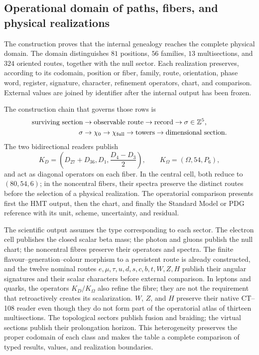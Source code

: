 \subsection*{Operational domain of paths, fibers, and physical realizations}

The construction proves that the internal genealogy reaches the complete
physical domain. The domain distinguishes
\(81\) positions, \(56\) families, \(13\) multisections, and \(324\) oriented
routes, together with the null sector. Each realization preserves, according to its codomain,
position or fiber, family, route, orientation, phase word, register,
signature, character, refinement operators, chart, and comparison. External
values are joined by identifier after the internal output has been frozen.

The construction chain that governs those rows is
\[
 \begin{aligned}
 \text{surviving section}&\to\text{observable route}
 \to\text{record}\to\sigma\in\mathbb Z^5,\\
 \sigma&\to\chi_0\to\chi_{\rm full}\to\text{towers}
 \to\text{dimensional section}.
 \end{aligned}
\]
The two bidirectional readers publish
\[
 K_D=\left(D_{27}+D_{36},D_1,\frac{D_4-D_3}{2}\right),
 \qquad
 K_\Omega=(\Omega,54,P_6),
\]
and act as diagonal operators on each fiber. In the central cell, both reduce to \((80,54,6)\); in the noncentral fibers, their spectra preserve the distinct routes before the selection of a physical realization. The operatorial comparison presents first the HMT output, then the chart, and finally the Standard Model or PDG reference with its unit, scheme, uncertainty, and residual.

The scientific output assumes the type corresponding to each sector. The electron
cell publishes the closed scalar beta mass; the photon and gluons publish the
null chart; the noncentral fibres preserve their operators and spectra.
The finite flavour--generation--colour morphism to a persistent route is already
constructed, and the twelve nominal routes
\(e,\mu,\tau,u,d,s,c,b,t,W,Z,H\) publish their angular signatures and their
scalar characters before external comparison. In leptons and quarks, the
operators \(K_D/K_\Omega\) also refine the fibre; they are not the requirement that
retroactively creates its scalarization. \(W\), \(Z\), and \(H\) preserve their
native CT--108 reader even though they do not form part of the operatorial atlas of thirteen
multisections. The topological sectors publish fusion and braiding; the
virtual sections publish their prolongation horizon. This
heterogeneity preserves the proper codomain of each class and makes the
table a complete comparison of typed results, values, and
realization boundaries.

